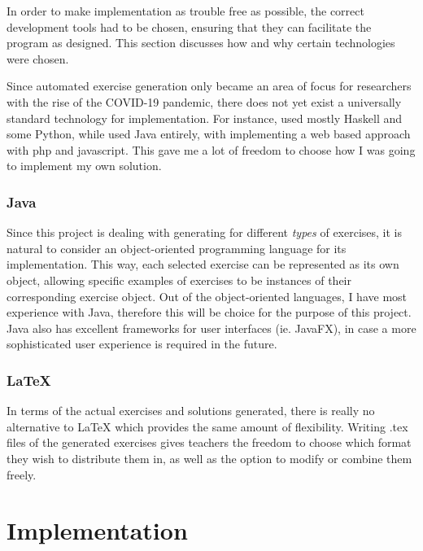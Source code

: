 \documentclass{l4proj}
\begin{document}
In order to make implementation as trouble free as possible, the correct development tools had to be chosen, ensuring that they can facilitate the program as designed. This section discusses how and why certain technologies were chosen.

Since automated exercise generation only became an area of focus for researchers with the rise of the COVID-19 pandemic, there does not yet exist a universally standard technology for implementation. For instance, \citet{Hoz21} used mostly Haskell and some Python, while \citet {Esh22} used Java entirely, with \citet{Kot19} implementing a web based approach with php and javascript. This gave me a lot of freedom to choose how I was going to implement my own solution. 

\subsection{Java}

Since this project is dealing with generating for different \emph{types} of exercises, it is natural to consider an object-oriented programming language for its implementation. This way, each selected exercise can be represented as its own object, allowing specific examples of exercises to be instances of their corresponding exercise object. Out of the object-oriented languages, I have most experience with Java, therefore this will be choice for the purpose of this project. Java also has excellent frameworks for user interfaces (ie. JavaFX), in case a more sophisticated user experience is required in the future.

\subsection{LaTeX}

In terms of the actual exercises and solutions generated, there is really no alternative to LaTeX which provides the same amount of flexibility. Writing .tex files of the generated exercises gives teachers the freedom to choose which format they wish to distribute them in, as well as the option to modify or combine them freely.

\chapter{Implementation}
\label{chap:imp}
\end{document}
